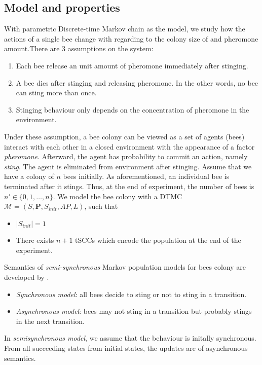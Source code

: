 \subsection{Model and properties}
With parametric Discrete-time Markov chain as the model, we study how the actions of a single bee
change with regarding to the colony size of and pheromone amount.There are 3 assumptions on the
system:
\begin{enumerate}
    \item Each bee release an unit amount of pheromone immediately after stinging.
    \item A bee dies after stinging and releasing pheromone. In the other words, no bee can sting
          more than once.
    \item Stinging behaviour only depends on the concentration of pheromone in the environment.
\end{enumerate}
Under these assumption, a bee colony can be viewed as a set of agents (bees) interact with each
other in a closed environment with the appearance of a factor \textit{pheromone}. Afterward, the
agent has probability to commit an action, namely \textit{sting}. The agent is eliminated from
environment after stinging. Assume that we have a colony of $n$ bees initially. As aforementioned,
an individual bee is terminated after it stings. Thus, at the end of experiment, the number of bees
is $n'\in\{0,1,\ldots,n\}$. We model the bee colony with a DTMC $\mathcal{M}=(S,\mathbf{P},
    S_{init}, AP,L)$, such that
\begin{itemize}
    \item $|S_{init}|=1$
    \item There exists $n+1$ tSCCs which encode the population at the end of the experiment.
\end{itemize}
Semantics of \textit{semi-synchronous} Markov population models for bees colony are developed by
\cite{hajnal2019data}.
\begin{itemize}
    \item \textit{Synchronous model}: all bees decide to sting or not to sting in a transition.
    \item \textit{Asynchronous model}: bees may not sting in a transition but probably stings in the next transition.
\end{itemize}
In \textit{semisynchronous model}, we assume that the behaviour is initally synchronous. From all
succeeding states from initial states, the updates are of asynchronous semantics.
